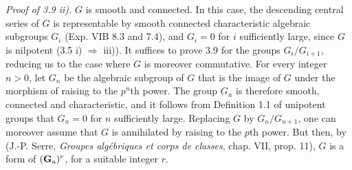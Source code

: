 \noindent\emph{Proof of 3.9 ii).} $G$ is smooth and connected. In this case, the descending central series of $G$ is representable by smooth connected characteristic algebraic subgroups $G_i$ (Exp. VIB 8.3 and 7.4), and $G_i=0$ for $i$ sufficiently large, since $G$ is nilpotent (3.5 i) $\Rightarrow$ iii)). It suffices to prove 3.9 for the groups $G_i/G_{i+1}$, reducing us to the case where $G$ is moreover commutative. For every integer $n>0$, let $G_n$ be the algebraic subgroup of $G$ that is the image of $G$ under the morphism of raising to the $p^n$th power. The group $G_n$ is therefore smooth, connected and characteristic, and it follows from Definition 1.1 of unipotent groups that $G_n=0$ for $n$ sufficiently large. Replacing $G$ by $G_n/G_{n+1}$, one can moreover assume that $G$ is annihilated by raising to the $p$th power. But then, by (J.-P. Serre, \emph{Groupes algébriques et corps de classes}, chap. VII, prop. 11), $G$ is a form of $(\mathbf{G}_{\mathrm{a}})^r$, for a suitable integer $r$.
